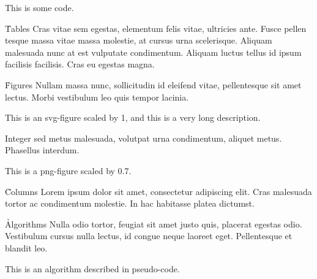 \documentclass{thesis}
\begin{document}
    {This is some code.}

\h{Tables}
Cras vitae sem egestas, elementum felis vitae, ultricies ante. Fusce pellen tesque massa vitae massa molestie, at cursus urna scelerisque. Aliquam malesuada nunc at est vulputate condimentum. Aliquam luctus tellus id ipsum facilisis facilisis. Cras eu egestas magna.


\h{Figures}
Nullam massa nunc, sollicitudin id eleifend vitae, pellentesque sit amet lectus. Morbi vestibulum leo quis tempor lacinia.

    {This is an svg-figure scaled by 1, and this is a very long description.}

Integer sed metus malesuada, volutpat urna condimentum, aliquet metus. Phasellus interdum.

    {This is a png-figure scaled by 0.7.}


\h{Columns}
Lorem ipsum dolor sit amet, consectetur adipiscing elit. Cras malesuada tortor ac condimentum molestie. In hac habitasse platea dictumst.


\h{Algorithms}
Nulla odio tortor, feugiat sit amet justo quis, placerat egestas odio. Vestibulum cursus nulla lectus, id congue neque laoreet eget. Pellentesque et blandit leo.

    {This is an algorithm described in pseudo-code.}
\end{document}
